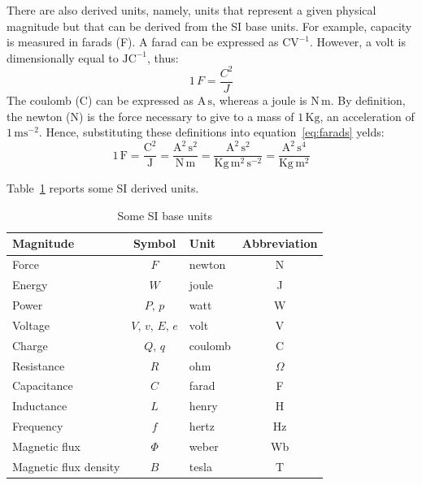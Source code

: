 There are also derived units, namely, units that represent a given physical magnitude but that can be derived from the SI base units. For example, capacity is measured in farads (F). A farad can be expressed as $\textrm{C}\textrm{V}^{-1}$. However, a volt is dimensionally equal to $\textrm{J}\textrm{C}^{-1}$, thus:
\begin{equation}
1\,F = \frac{C^2}{J}\label{eq:farads}
\end{equation}
The coulomb (C) can be expressed as $\textrm{A}\,\textrm{s}$, whereas a joule is $\textrm{N}\,\textrm{m}$. By definition, the newton (N) is the force necessary to give to a mass of $1\,\textrm{Kg}$, an acceleration of $1\,\textrm{m}\textrm{s}^{-2}$. Hence, substituting these definitions into equation~\ref{eq:farads} yelds:
\begin{equation}
1\,\textrm{F} = \frac{\textrm{C}^2}{\textrm{J}} = \frac{\textrm{A}^2\,\textrm{s}^2}{\textrm{N}\,\textrm{m}}= \frac{\textrm{A}^2\,\textrm{s}^2}{\textrm{Kg}\,\textrm{m}^2\,\textrm{s}^{-2}}=\frac{\textrm{A}^2\,\textrm{s}^4}{\textrm{Kg}\,\textrm{m}^2}
\end{equation}

Table~\ref{tb:si_derived} reports some SI derived units.

\begin{table}[h!]
  \centering
  \begin{tabular}{ l  c  l  c }
  \textbf{Magnitude} & \textbf{Symbol} & \textbf{Unit} & \textbf{Abbreviation} \\
  \hline
  Force & $F$ & newton & N \\
  Energy & $W$ & joule & J \\
  Power & $P,\,p$ & watt & W \\
  Voltage & $V,\,v,\,E,\,e$ & volt & V \\
  Charge & $Q,\,q$ & coulomb & C \\
  Resistance & $R$ & ohm & $\Omega$ \\
  Capacitance & $C$ & farad & F \\
  Inductance & $L$ & henry & H \\
  Frequency & $f$ & hertz & Hz \\
  Magnetic flux & $\Phi$ & weber & Wb \\
  Magnetic flux density & $B$ & tesla & T \\
  \end{tabular}
  \caption{Some SI base units}
  \label{tb:si_derived}
\end{table}

